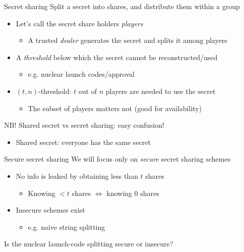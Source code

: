 \begin{frame}{Secret sharing}
  Split a secret into shares, and distribute them within a group
  \begin{itemize}[<+(1)->]
    \item Let's call the secret share holders \emph{players}
    \begin{itemize}
      \item A trusted \emph{dealer} generates the secret and splits it among players
    \end{itemize}
    \item A \emph{threshold} below which the secret cannot be reconstructed/used
    \begin{itemize}
      \item e.g. nuclear launch codes/approval
    \end{itemize}
    \item $(t, n)$-threshold: $t$ out of $n$ players are needed to use the secret
    \begin{itemize}
      \item The subset of players matters not (good for availability)
    \end{itemize}
  \end{itemize}

  \vspace*{1em}

  \pause
  NB! Shared secret vs secret sharing: easy confusion!
  \begin{itemize}[<+(1)->]
    \item Shared secret: everyone has the same secret
  \end{itemize}
\end{frame}

\begin{frame}{Secure secret sharing}
  We will focus only on \emph{secure} secret sharing schemes
  \begin{itemize}[<+(1)->]
    \item No info is leaked by obtaining less than $t$ shares
    \begin{itemize}
      \item Knowing $<t$ shares $\iff$ knowing $0$ shares
    \end{itemize}
    \item Insecure schemes exist
    \begin{itemize}
      \item e.g. naive string splitting
    \end{itemize}
  \end{itemize}

  \vspace*{1em}

  \pause
  Is the nuclear launch-code splitting secure or insecure?
\end{frame}


